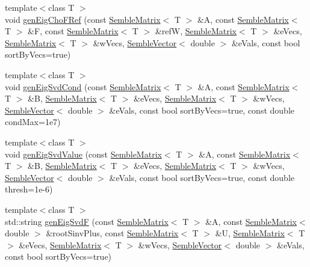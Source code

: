 \begin{DoxyCompactItemize}
\item 
{\footnotesize template$<$class T $>$ }\\void \mbox{\hyperlink{namespaceSEMBLE_a9dcee3599c76380594ebea593dc26a15}{gen\+Eig\+Cho\+F\+Ref}} (const \mbox{\hyperlink{structSEMBLE_1_1SembleMatrix}{Semble\+Matrix}}$<$ T $>$ \&A, const \mbox{\hyperlink{structSEMBLE_1_1SembleMatrix}{Semble\+Matrix}}$<$ T $>$ \&F, const \mbox{\hyperlink{structSEMBLE_1_1SembleMatrix}{Semble\+Matrix}}$<$ T $>$ \&refW, \mbox{\hyperlink{structSEMBLE_1_1SembleMatrix}{Semble\+Matrix}}$<$ T $>$ \&e\+Vecs, \mbox{\hyperlink{structSEMBLE_1_1SembleMatrix}{Semble\+Matrix}}$<$ T $>$ \&w\+Vecs, \mbox{\hyperlink{structSEMBLE_1_1SembleVector}{Semble\+Vector}}$<$ double $>$ \&e\+Vals, const bool sort\+By\+Vecs=true)
\item 
{\footnotesize template$<$class T $>$ }\\void \mbox{\hyperlink{namespaceSEMBLE_abef6ebd7bb063b0d69ba782471f9e4a5}{gen\+Eig\+Svd\+Cond}} (const \mbox{\hyperlink{structSEMBLE_1_1SembleMatrix}{Semble\+Matrix}}$<$ T $>$ \&A, const \mbox{\hyperlink{structSEMBLE_1_1SembleMatrix}{Semble\+Matrix}}$<$ T $>$ \&B, \mbox{\hyperlink{structSEMBLE_1_1SembleMatrix}{Semble\+Matrix}}$<$ T $>$ \&e\+Vecs, \mbox{\hyperlink{structSEMBLE_1_1SembleMatrix}{Semble\+Matrix}}$<$ T $>$ \&w\+Vecs, \mbox{\hyperlink{structSEMBLE_1_1SembleVector}{Semble\+Vector}}$<$ double $>$ \&e\+Vals, const bool sort\+By\+Vecs=true, const double cond\+Max=1e7)
\item 
{\footnotesize template$<$class T $>$ }\\void \mbox{\hyperlink{namespaceSEMBLE_ad47fd10bab63a835bef0e6fa42868f83}{gen\+Eig\+Svd\+Value}} (const \mbox{\hyperlink{structSEMBLE_1_1SembleMatrix}{Semble\+Matrix}}$<$ T $>$ \&A, const \mbox{\hyperlink{structSEMBLE_1_1SembleMatrix}{Semble\+Matrix}}$<$ T $>$ \&B, \mbox{\hyperlink{structSEMBLE_1_1SembleMatrix}{Semble\+Matrix}}$<$ T $>$ \&e\+Vecs, \mbox{\hyperlink{structSEMBLE_1_1SembleMatrix}{Semble\+Matrix}}$<$ T $>$ \&w\+Vecs, \mbox{\hyperlink{structSEMBLE_1_1SembleVector}{Semble\+Vector}}$<$ double $>$ \&e\+Vals, const bool sort\+By\+Vecs=true, const double thresh=1e-\/6)
\item 
{\footnotesize template$<$class T $>$ }\\std\+::string \mbox{\hyperlink{namespaceSEMBLE_a4aaeea64468bfb9ed46e42fd7d0eaa24}{gen\+Eig\+SvdF}} (const \mbox{\hyperlink{structSEMBLE_1_1SembleMatrix}{Semble\+Matrix}}$<$ T $>$ \&A, const \mbox{\hyperlink{structSEMBLE_1_1SembleMatrix}{Semble\+Matrix}}$<$ double $>$ \&root\+Sinv\+Plus, const \mbox{\hyperlink{structSEMBLE_1_1SembleMatrix}{Semble\+Matrix}}$<$ T $>$ \&U, \mbox{\hyperlink{structSEMBLE_1_1SembleMatrix}{Semble\+Matrix}}$<$ T $>$ \&e\+Vecs, \mbox{\hyperlink{structSEMBLE_1_1SembleMatrix}{Semble\+Matrix}}$<$ T $>$ \&w\+Vecs, \mbox{\hyperlink{structSEMBLE_1_1SembleVector}{Semble\+Vector}}$<$ double $>$ \&e\+Vals, const bool sort\+By\+Vecs=true)

\end{DoxyCompactItemize}
